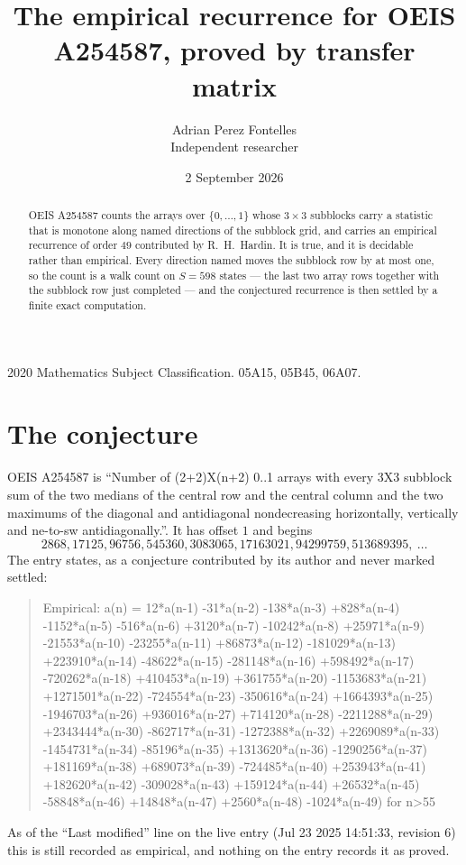 \documentclass[11pt,a4paper]{article}
\title{The empirical recurrence for OEIS A254587, proved by transfer matrix}
\author{Adrian Perez Fontelles\\ \small Independent researcher}
\date{2 September 2026}
\theoremstyle{plain}
\theoremstyle{definition}
\begin{document}
\maketitle

\begin{abstract}
OEIS A254587 counts the arrays over $\{0,\dots,1\}$ whose $3\times3$ subblocks carry a
statistic that is monotone along named directions of the subblock grid, and carries an
empirical recurrence of order $49$ contributed by R.~H.~Hardin. It is true, and it is
decidable rather than empirical. Every direction named moves the subblock row by at most one,
so the count is a walk count on $S=598$ states --- the last two array rows together with the
subblock row just completed --- and the conjectured recurrence is then settled by a finite
exact computation.
\end{abstract}

\noindent\small 2020 Mathematics Subject Classification. 05A15, 05B45, 06A07.\normalsize

\section{The conjecture}

OEIS A254587 is ``Number of (2+2)X(n+2) 0..1 arrays with every 3X3 subblock sum of the two medians of the central row and the central column and the two maximums of the diagonal and antidiagonal nondecreasing horizontally, vertically and ne-to-sw antidiagonally.''. It has offset $1$ and begins
\[
2868, 17125, 96756, 545360, 3083065, 17163021, 94299759, 513689395,\ \dots
\]
The entry states, as a conjecture contributed by its author and never marked settled:
\begin{quote}
Empirical: a(n) = 12*a(n-1) -31*a(n-2) -138*a(n-3) +828*a(n-4) -1152*a(n-5) -516*a(n-6) +3120*a(n-7) -10242*a(n-8) +25971*a(n-9) -21553*a(n-10) -23255*a(n-11) +86873*a(n-12) -181029*a(n-13) +223910*a(n-14) -48622*a(n-15) -281148*a(n-16) +598492*a(n-17) -720262*a(n-18) +410453*a(n-19) +361755*a(n-20) -1153683*a(n-21) +1271501*a(n-22) -724554*a(n-23) -350616*a(n-24) +1664393*a(n-25) -1946703*a(n-26) +936016*a(n-27) +714120*a(n-28) -2211288*a(n-29) +2343444*a(n-30) -862717*a(n-31) -1272388*a(n-32) +2269089*a(n-33) -1454731*a(n-34) -85196*a(n-35) +1313620*a(n-36) -1290256*a(n-37) +181169*a(n-38) +689073*a(n-39) -724485*a(n-40) +253943*a(n-41) +182620*a(n-42) -309028*a(n-43) +159124*a(n-44) +26532*a(n-45) -58848*a(n-46) +14848*a(n-47) +2560*a(n-48) -1024*a(n-49) for n>55
\end{quote}
As of the ``Last modified'' line on the live entry (Jul 23 2025 14:51:33, revision 6) this is still
recorded as empirical, and nothing on the entry records it as proved.
\end{document}
